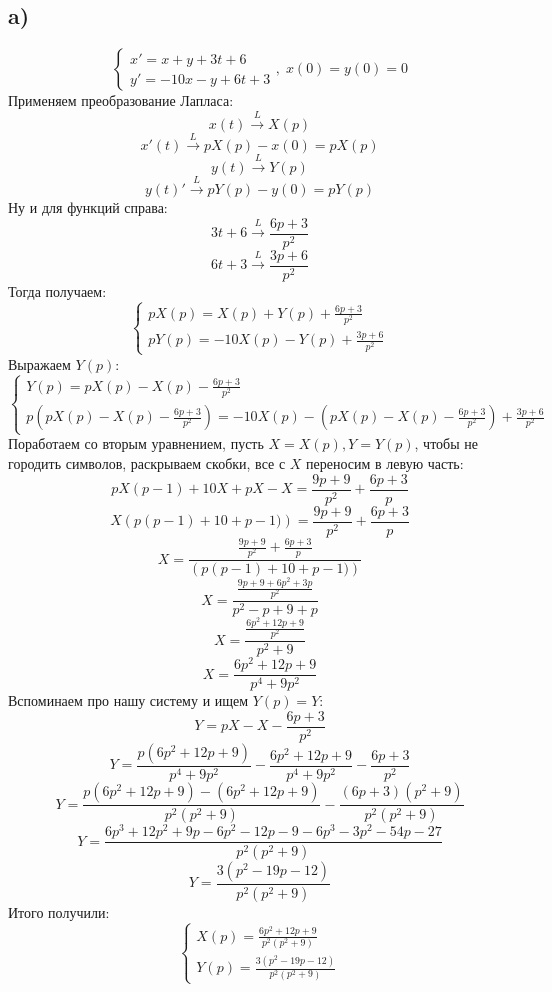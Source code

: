\documentclass[a4paper,12pt]{article}
\begin{document}
\subsection*{a)}
\[
\begin{cases}
x' = x + y + 3t + 6 \\
y' = -10x -y + 6t + 3
\end{cases}, \; x(0) = y(0) = 0
\]
Применяем преобразование Лапласа:
\[
x(t) \overset{L}{\rightarrow} X(p) 
\]
\[
x'(t) \overset{L}{\rightarrow} pX(p) - x(0) = pX(p)
\]
\[
y(t) \overset{L}{\rightarrow} Y(p)
\]
\[
y(t)' \overset{L}{\rightarrow}pY(p) - y(0) = pY(p)
\]
Ну и для функций справа:
\[
3t + 6 \overset{L}{\rightarrow}\frac{6p + 3}{p^2}
\]
\[
6t + 3 \overset{L}{\rightarrow} \frac{3p + 6}{p^2}
\]
Тогда получаем:
\[
\begin{cases}
pX(p) = X(p) + Y(p) + \frac{6p + 3}{p^2} \\
pY(p) = -10X(p) - Y(p) + \frac{3p + 6}{p^2}
\end{cases}
\]
Выражаем $Y(p)$:
\[
\begin{cases}
Y(p) = pX(p) - X(p) - \frac{6p + 3}{p^2}\\
p\left(pX(p) - X(p) - \frac{6p + 3}{p^2}\right) = -10X(p) - \left(pX(p) - X(p) - \frac{6p + 3}{p^2}\right) + \frac{3p + 6}{p^2}
\end{cases}
\]
Поработаем со вторым уравнением, пусть $X = X(p), Y = Y(p)$, чтобы не городить символов, раскрываем скобки, все с $X$ переносим в левую часть:
\[
pX(p - 1) + 10X + pX - X= \frac{9p + 9}{p^2}  + \frac{6p+3}{p} 
\]
\[
X \left(
p(p-1) + 10 + p - 1) 
\right) =\frac{9p + 9}{p^2}  + \frac{6p+3}{p} 
\]
\[
X = \frac{\frac{9p + 9}{p^2}  + \frac{6p+3}{p} }{\left(
p(p-1) + 10 + p - 1) 
\right)}
\]
\[
X = \frac{\frac{9p + 9 + 6p^2 + 3p}{p^2}}{p^2 - p + 9 + p}
\]
\[
X = \frac{\frac{6p^2 + 12p + 9}{p^2}}{p^2 + 9}
\]
\[
X = \frac{6p^2 + 12p + 9}{p^4 + 9p^2}
\]
Вспоминаем про нашу систему и ищем $Y(p) = Y$:
\[
Y= pX - X - \frac{6p + 3}{p^2}
\]
\[
Y = \frac{p(6p^2 + 12p + 9)}{p^4 + 9p^2} - \frac{6p^2 + 12p + 9}{p^4 + 9p^2} - \frac{6p + 3}{p^2}
\]
\[
Y = \frac{p(6p^2 + 12p + 9) - (6p^2 + 12p + 9)}{p^2(p^2+ 9)} - \frac{(6p+3)(p^2 + 9)}{p^2(p^2 + 9)}
\]
\[
Y = \frac{6p^3 + 12p^2 + 9p - 6p^2- 12p - 9 -6p^3 - 3p^2 - 54p - 27}{p^2(p^2 + 9)}
\]
\[
Y =  \frac{3(p^2 - 19p -12)}{p^2(p^2 + 9)}
\]
Итого получили:
\[
\begin{cases}
X(p) = \frac{6p^2 + 12p + 9}{p^2(p^2 + 9)} \\
Y(p) =  \frac{3(p^2 - 19p -12)}{p^2(p^2 + 9)}
\end{cases}
\]
\end{document}
